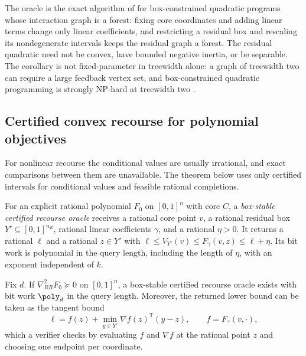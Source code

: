 The oracle is the exact algorithm of \citet{pia2026-treewidth-and-the-complexity-of} for
box-constrained quadratic programs whose interaction graph is a forest:
fixing core coordinates and adding linear terms change only linear
coefficients, and restricting a residual box and rescaling its nondegenerate
intervals keeps the residual graph a forest. The residual quadratic need not
be convex, have bounded negative inertia, or be separable. The corollary
is not fixed-parameter in treewidth alone: a graph of treewidth two can
require a large feedback vertex set, and box-constrained quadratic
programming is strongly NP-hard at treewidth two
\citep{pia2026-treewidth-and-the-complexity-of}.

\subsection{Certified convex recourse for polynomial objectives}\label{sec:rec:poly}

For nonlinear recourse the conditional values are usually irrational, and
exact comparisons between them are unavailable. The theorem below uses only
certified intervals for conditional values and feasible rational
completions.

\begin{definition}\label{def:rec:cert-oracle}
For an explicit rational polynomial $F_0$ on $[0,1]^n$ with core $C$, a
\emph{box-stable certified recourse oracle} receives a rational core point
$v$, a rational residual box $Y'\subseteq[0,1]^{n_R}$, rational linear
coefficients $\gamma$, and a rational $\eta>0$. It returns a rational $\ell$
and a rational $z\in Y'$ with $\ell\le V_{Y'}(v)\le F_\gamma(v,z)\le\ell+\eta$.
Its bit work is polynomial in the query length, including the length of
$\eta$, with an exponent independent of $k$.
\end{definition}

\begin{lemma}\label{lem:rec:convex-oracle}
Fix $d$. If $\nabla^2_{RR}F_0\succeq0$ on $[0,1]^n$, a box-stable certified
recourse oracle exists with bit work $\poly_d$ in the query length. Moreover,
the returned lower bound can be taken as the tangent bound
\begin{equation}\label{eq:rec:tangent}
 \ell=f(z)+\min_{y\in Y'}\nabla f(z)^{\mathsf T}(y-z),\qquad
 f=F_\gamma(v,\cdot),
\end{equation}
which a verifier checks by evaluating $f$ and $\nabla f$ at the rational
point $z$ and choosing one endpoint per coordinate.
\end{lemma}


